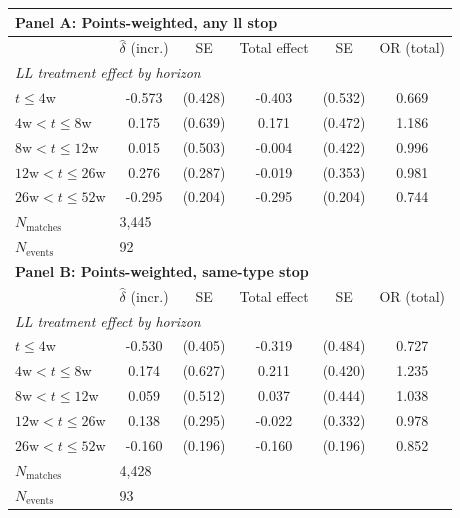 \begin{tabular}{lccccc}
\toprule
\multicolumn{6}{l}{\textbf{Panel A: Points-weighted, any ll stop}} \\
\midrule
 & $\hat{\delta}$ (incr.) & SE & Total effect & SE & OR (total) \\
\midrule
\multicolumn{6}{l}{\textit{LL treatment effect by horizon}} \\
$t \leq 4$w & -0.573 & (0.428) & -0.403 & (0.532) & 0.669 \\
$4\text{w} < t \leq 8$w & 0.175 & (0.639) & 0.171 & (0.472) & 1.186 \\
$8\text{w} < t \leq 12$w & 0.015 & (0.503) & -0.004 & (0.422) & 0.996 \\
$12\text{w} < t \leq 26$w & 0.276 & (0.287) & -0.019 & (0.353) & 0.981 \\
$26\text{w} < t \leq 52$w & -0.295 & (0.204) & -0.295 & (0.204) & 0.744 \\
[4pt]
$N_{\text{matches}}$ & \multicolumn{5}{l}{3,445} \\
$N_{\text{events}}$ & \multicolumn{5}{l}{92} \\
\midrule
\multicolumn{6}{l}{\textbf{Panel B: Points-weighted, same-type stop}} \\
\midrule
 & $\hat{\delta}$ (incr.) & SE & Total effect & SE & OR (total) \\
\midrule
\multicolumn{6}{l}{\textit{LL treatment effect by horizon}} \\
$t \leq 4$w & -0.530 & (0.405) & -0.319 & (0.484) & 0.727 \\
$4\text{w} < t \leq 8$w & 0.174 & (0.627) & 0.211 & (0.420) & 1.235 \\
$8\text{w} < t \leq 12$w & 0.059 & (0.512) & 0.037 & (0.444) & 1.038 \\
$12\text{w} < t \leq 26$w & 0.138 & (0.295) & -0.022 & (0.332) & 0.978 \\
$26\text{w} < t \leq 52$w & -0.160 & (0.196) & -0.160 & (0.196) & 0.852 \\
[4pt]
$N_{\text{matches}}$ & \multicolumn{5}{l}{4,428} \\
$N_{\text{events}}$ & \multicolumn{5}{l}{93} \\
\bottomrule
\end{tabular}
